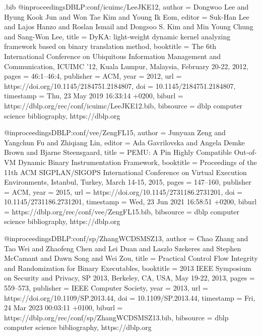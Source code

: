 \begin{filecontents}{\jobname.bib}
@inproceedings{DBLP:conf/icuimc/LeeJKE12,
  author       = {Dongwoo Lee and
                  Hyung Kook Jun and
                  Won Tae Kim and
                  Young Ik Eom},
  editor       = {Suk{-}Han Lee and
                  Lajos Hanzo and
                  Roslan Ismail and
                  Dongsoo S. Kim and
                  Min Young Chung and
                  Sang{-}Won Lee},
  title        = {DyKA: light-weight dynamic kernel analyzing framework based on binary
                  translation method},
  booktitle    = {The 6th International Conference on Ubiquitous Information Management
                  and Communication, {ICUIMC} '12, Kuala Lumpur, Malaysia, February
                  20-22, 2012},
  pages        = {46:1--46:4},
  publisher    = {{ACM}},
  year         = {2012},
  url          = {https://doi.org/10.1145/2184751.2184807},
  doi          = {10.1145/2184751.2184807},
  timestamp    = {Thu, 23 May 2019 16:33:14 +0200},
  biburl       = {https://dblp.org/rec/conf/icuimc/LeeJKE12.bib},
  bibsource    = {dblp computer science bibliography, https://dblp.org}
}

@inproceedings{DBLP:conf/vee/ZengFL15,
  author       = {Junyuan Zeng and
                  Yangchun Fu and
                  Zhiqiang Lin},
  editor       = {Ada Gavrilovska and
                  Angela Demke Brown and
                  Bjarne Steensgaard},
  title        = {{PEMU:} {A} Pin Highly Compatible Out-of-VM Dynamic Binary Instrumentation
                  Framework},
  booktitle    = {Proceedings of the 11th {ACM} {SIGPLAN/SIGOPS} International Conference
                  on Virtual Execution Environments, Istanbul, Turkey, March 14-15,
                  2015},
  pages        = {147--160},
  publisher    = {{ACM}},
  year         = {2015},
  url          = {https://doi.org/10.1145/2731186.2731201},
  doi          = {10.1145/2731186.2731201},
  timestamp    = {Wed, 23 Jun 2021 16:58:51 +0200},
  biburl       = {https://dblp.org/rec/conf/vee/ZengFL15.bib},
  bibsource    = {dblp computer science bibliography, https://dblp.org}
}

@inproceedings{DBLP:conf/sp/ZhangWCDSMSZ13,
  author       = {Chao Zhang and
                  Tao Wei and
                  Zhaofeng Chen and
                  Lei Duan and
                  Laszlo Szekeres and
                  Stephen McCamant and
                  Dawn Song and
                  Wei Zou},
  title        = {Practical Control Flow Integrity and Randomization for Binary Executables},
  booktitle    = {2013 {IEEE} Symposium on Security and Privacy, {SP} 2013, Berkeley,
                  CA, USA, May 19-22, 2013},
  pages        = {559--573},
  publisher    = {{IEEE} Computer Society},
  year         = {2013},
  url          = {https://doi.org/10.1109/SP.2013.44},
  doi          = {10.1109/SP.2013.44},
  timestamp    = {Fri, 24 Mar 2023 00:03:11 +0100},
  biburl       = {https://dblp.org/rec/conf/sp/ZhangWCDSMSZ13.bib},
  bibsource    = {dblp computer science bibliography, https://dblp.org}
}


\end{filecontents}
